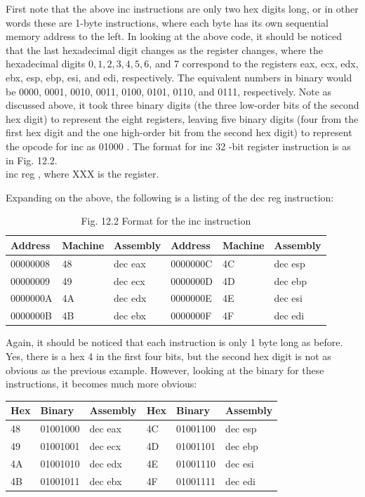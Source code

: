 \documentclass[10pt]{book}
\begin{document}
First note that the above inc instructions are only two hex digits long, or in other words these are 1-byte instructions, where each byte has its own sequential memory address to the left. In looking at the above code, it should be noticed that the last hexadecimal digit changes as the register changes, where the hexadecimal digits $0,1,2,3,4,5,6$, and 7 correspond to the registers eax, ecx, edx, ebx, esp, ebp, esi, and edi, respectively. The equivalent numbers in binary would be 0000, 0001, 0010, 0011, 0100, 0101, 0110, and 0111, respectively. Note as discussed above, it took three binary digits (the three low-order bits of the second hex digit) to represent the eight registers, leaving five binary digits (four from the first hex digit and the one high-order bit from the second hex digit) to represent the opcode for inc as 01000 . The format for inc 32 -bit register instruction is as in Fig. 12.2.\\
inc reg , where XXX is the register.

Expanding on the above, the following is a listing of the dec reg instruction:

\begin{table}[htbp]
\begin{center}
\captionsetup{labelformat=empty}
\caption{Fig. 12.2 Format for the inc instruction}
\begin{tabular}{|l|l|l|l|l|l|}
\hline
Address & Machine & Assembly & Address & Machine & Assembly \\
\hline
00000008 & 48 & dec eax & 0000000C & 4C & dec esp \\
\hline
00000009 & 49 & dec ecx & 0000000D & 4D & dec ebp \\
\hline
0000000A & 4A & dec edx & 0000000E & 4E & dec esi \\
\hline
0000000B & 4B & dec ebx & 0000000F & 4F & dec edi \\
\hline
\end{tabular}
\end{center}
\end{table}

Again, it should be noticed that each instruction is only 1 byte long as before. Yes, there is a hex 4 in the first four bits, but the second hex digit is not as obvious as the previous example. However, looking at the binary for these instructions, it becomes much more obvious:

\begin{center}
\begin{tabular}{|l|l|l|l|l|l|}
\hline
Hex & Binary & Assembly & Hex & Binary & Assembly \\
\hline
48 & 01001000 & dec eax & 4C & 01001100 & dec esp \\
\hline
49 & 01001001 & dec ecx & 4D & 01001101 & dec ebp \\
\hline
4A & 01001010 & dec edx & 4E & 01001110 & dec esi \\
\hline
4B & 01001011 & dec ebx & 4F & 01001111 & dec edi \\
\hline
\end{tabular}
\end{center}
\end{document}
